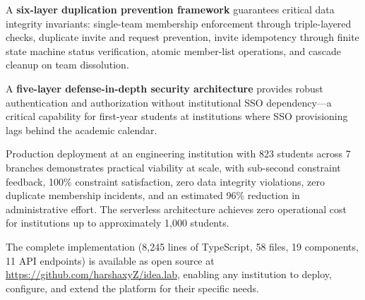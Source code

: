 \documentclass[12pt,a4paper]{article}
\begin{document}
A \textbf{six-layer duplication prevention framework} guarantees critical data integrity invariants: single-team membership enforcement through triple-layered checks, duplicate invite and request prevention, invite idempotency through finite state machine status verification, atomic member-list operations, and cascade cleanup on team dissolution.

A \textbf{five-layer defense-in-depth security architecture} provides robust authentication and authorization without institutional SSO dependency---a critical capability for first-year students at institutions where SSO provisioning lags behind the academic calendar.

Production deployment at an engineering institution with 823 students across 7 branches demonstrates practical viability at scale, with sub-second constraint feedback, 100\% constraint satisfaction, zero data integrity violations, zero duplicate membership incidents, and an estimated 96\% reduction in administrative effort. The serverless architecture achieves zero operational cost for institutions up to approximately 1,000 students.

The complete implementation (8,245 lines of TypeScript, 58 files, 19 components, 11 API endpoints) is available as open source at \url{https://github.com/harshaxyZ/idea.lab}, enabling any institution to deploy, configure, and extend the platform for their specific needs.
\end{document}
